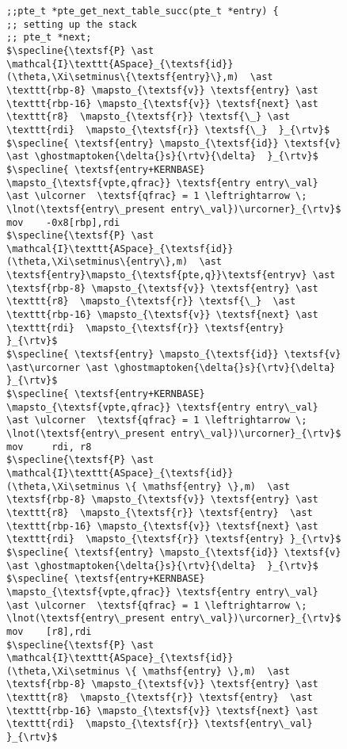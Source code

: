 \begin{figure}\footnotesize
  \begin{lstlisting}[mathescape]
;;pte_t *pte_get_next_table_succ(pte_t *entry) {
;; setting up the stack
;; pte_t *next;
$\specline{\textsf{P} \ast \mathcal{I}\texttt{ASpace}_{\textsf{id}}(\theta,\Xi\setminus\{\textsf{entry}\},m)  \ast \texttt{rbp-8} \mapsto_{\textsf{v}} \textsf{entry} \ast  \texttt{rbp-16} \mapsto_{\textsf{v}} \textsf{next} \ast \texttt{r8}  \mapsto_{\textsf{r}} \textsf{\_} \ast \texttt{rdi}  \mapsto_{\textsf{r}} \textsf{\_}  }_{\rtv}$
$\specline{ \textsf{entry} \mapsto_{\textsf{id}} \textsf{v} \ast \ghostmaptoken{\delta{}s}{\rtv}{\delta}  }_{\rtv}$
$\specline{ \textsf{entry+KERNBASE} \mapsto_{\textsf{vpte,qfrac}} \textsf{entry entry\_val} \ast \ulcorner  \textsf{qfrac} = 1 \leftrightarrow \; \lnot(\textsf{entry\_present entry\_val})\urcorner}_{\rtv}$
mov    -0x8[rbp],rdi
$\specline{\textsf{P} \ast \mathcal{I}\texttt{ASpace}_{\textsf{id}}(\theta,\Xi\setminus\{entry\},m)  \ast \textsf{entry}\mapsto_{\textsf{pte,q}}\textsf{entryv} \ast \textsf{rbp-8} \mapsto_{\textsf{v}} \textsf{entry} \ast \texttt{r8}  \mapsto_{\textsf{r}} \textsf{\_}  \ast  \texttt{rbp-16} \mapsto_{\textsf{v}} \textsf{next} \ast \texttt{rdi}  \mapsto_{\textsf{r}} \textsf{entry}  }_{\rtv}$
$\specline{ \textsf{entry} \mapsto_{\textsf{id}} \textsf{v} \ast\urcorner \ast \ghostmaptoken{\delta{}s}{\rtv}{\delta}  }_{\rtv}$
$\specline{ \textsf{entry+KERNBASE} \mapsto_{\textsf{vpte,qfrac}} \textsf{entry entry\_val} \ast \ulcorner  \textsf{qfrac} = 1 \leftrightarrow \; \lnot(\textsf{entry\_present entry\_val})\urcorner}_{\rtv}$
mov     rdi, r8
$\specline{\textsf{P} \ast \mathcal{I}\texttt{ASpace}_{\textsf{id}}(\theta,\Xi\setminus \{ \mathsf{entry} \},m)  \ast \textsf{rbp-8} \mapsto_{\textsf{v}} \textsf{entry} \ast \texttt{r8}  \mapsto_{\textsf{r}} \textsf{entry}  \ast  \texttt{rbp-16} \mapsto_{\textsf{v}} \textsf{next} \ast \texttt{rdi}  \mapsto_{\textsf{r}} \textsf{entry} }_{\rtv}$
$\specline{ \textsf{entry} \mapsto_{\textsf{id}} \textsf{v} \ast \ghostmaptoken{\delta{}s}{\rtv}{\delta}  }_{\rtv}$
$\specline{ \textsf{entry+KERNBASE} \mapsto_{\textsf{vpte,qfrac}} \textsf{entry entry\_val} \ast \ulcorner  \textsf{qfrac} = 1 \leftrightarrow \; \lnot(\textsf{entry\_present entry\_val})\urcorner}_{\rtv}$
mov    [r8],rdi
$\specline{\textsf{P} \ast \mathcal{I}\texttt{ASpace}_{\textsf{id}}(\theta,\Xi\setminus \{ \mathsf{entry} \},m)  \ast \textsf{rbp-8} \mapsto_{\textsf{v}} \textsf{entry} \ast \texttt{r8}  \mapsto_{\textsf{r}} \textsf{entry}  \ast  \texttt{rbp-16} \mapsto_{\textsf{v}} \textsf{next} \ast \texttt{rdi}  \mapsto_{\textsf{r}} \textsf{entry\_val}   }_{\rtv}$

\end{lstlisting}
\end{figure}
